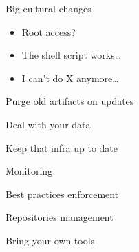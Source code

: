 \begin{iframe}
\item Big cultural changes
    \begin{itemize}
        \item Root access?
        \item The shell script works\dots
        \item I can't do X anymore\dots
    \end{itemize}
\item Purge old artifacts on updates
\item Deal with your data
\item Keep that infra up to date
\end{iframe}

\begin{iframe}
\item Monitoring
\item Best practices enforcement
\item Repositories management
\item Bring your own tools
\end{iframe}

\thankyouSlide
\renewcommand{\insertLogo}{}
\contactSlide
